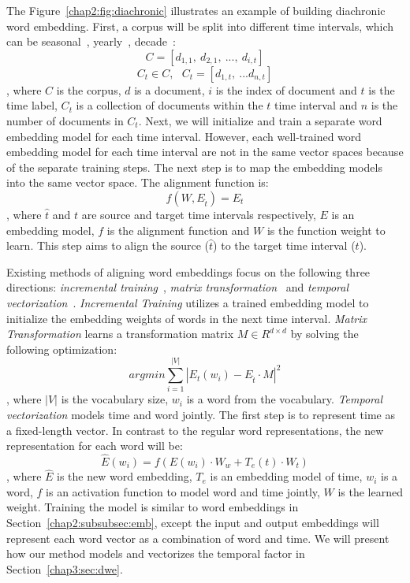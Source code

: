 The Figure~\ref{chap2:fig:diachronic} illustrates an example of building diachronic word embedding.
First, a corpus will be split into different time intervals, which can be seasonal~\cite{huang2018examining}, yearly~\cite{yao2018dynamic}, decade~\cite{hamilton2016diachronic}:
$$C = [d_{1, 1}, ~d_{2, 1}, ~..., ~d_{i, t}] $$
$$C_t \in C, ~~~ C_t = [d_{1, t},~ ...d_{n, t}]$$
, where $C$ is the corpus, $d$ is a document, $i$ is the index of document and $t$ is the time label, $C_t$ is a collection of documents within the $t$ time interval and $n$ is the number of documents in $C_t$.
Next, we will initialize and train a separate word embedding model for each time interval.
However, each well-trained word embedding model for each time interval are not in the same vector spaces because of the separate training steps. 
The next step is to map the embedding models into the same vector space.
The alignment function is:
$$f(W, E_{\hat{t}}) = E_t$$
, where $\hat{t}$ and $t$ are source and target time intervals respectively, $E$ is an embedding model, $f$ is the alignment function and $W$ is the function weight to learn.
This step aims to align the source ($\hat{t}$) to the target time interval ($t$).

Existing methods of aligning word embeddings focus on the following three directions: \textit{incremental training}~\cite{kim2014temporal}, \textit{matrix transformation}~\cite{kulkarni2015statistically, hamilton2016diachronic, yao2018dynamic} and \textit{temporal vectorization}~\cite{rosenfeld2018deep, huang2019neural}. 
\textit{Incremental Training} utilizes a trained embedding model to initialize the embedding weights of words in the next time interval.
\textit{Matrix Transformation} learns a transformation matrix $M \in R^{d \times d}$ by solving the following optimization:
$$argmin \sum_{i=1}^{|V|}|E_t(w_i) - E_{\hat{t}} \cdot M|^2$$
, where $|V|$ is the vocabulary size, $w_i$ is a word from the vocabulary.
\textit{Temporal vectorization} models time and word jointly. The first step is to represent time as a fixed-length vector. In contrast to the regular word representations, the new representation for each word will be:
$$\hat{E}(w_i) = f(E(w_i) \cdot W_w + T_e(t) \cdot W_t)$$
, where $\hat{E}$ is the new word embedding, $T_e$ is an embedding model of time, $w_i$ is a word, $f$ is an activation function to model word and time jointly, $W$ is the learned weight.
Training the model is similar to word embeddings in Section~\ref{chap2:subsubsec:emb}, except the input and output embeddings will represent each word vector as a combination of word and time.
We will present how our method models and vectorizes the temporal factor in Section~\ref{chap3:sec:dwe}.


